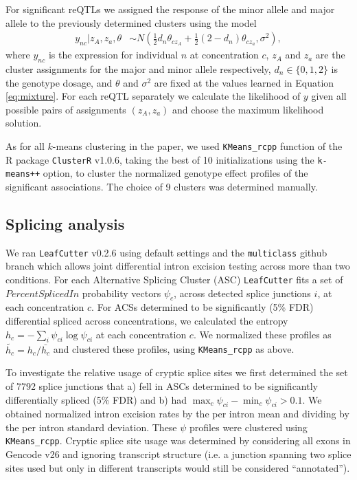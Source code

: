 \documentclass{article}
\begin{document}
{For significant reQTLs we assigned the response of the minor allele and major allele to the previously determined clusters using the model
\begin{align*}
y_{nc} | z_A,z_a, \theta &\sim N\left( \frac12 d_n \theta_{cz_A} + \frac12 (2 - d_n) \theta_{cz_a}, \sigma^2 \right),
\end{align*}
where $y_{nc}$ is the expression for individual $n$ at concentration $c$, $z_A$ and $z_a$ are the cluster assignments for the major and minor allele respectively, $d_n \in \{0,1,2\}$ is the genotype dosage, and $\theta$ and $\sigma^2$ are fixed at the values learned in Equation \ref{eq:mixture}. For each reQTL separately we calculate the likelihood of $y$ given all possible pairs of assignments $(z_A,z_a)$ and choose the maximum likelihood solution. 

As for all $k$-means clustering in the paper, we used \texttt{KMeans\_rcpp} function of the R package \texttt{ClusterR} v1.0.6, taking the best of 10 initializations using the \texttt{k-means++} option, to cluster the normalized genotype effect profiles of the significant associations. The choice of 9 clusters was determined manually. 

\subsection*{Splicing analysis}

We ran \texttt{LeafCutter} v0.2.6 using default settings and the \texttt{multiclass} github branch which allows joint differential intron excision testing across more than two conditions. For each Alternative Splicing Cluster (ASC) \texttt{LeafCutter} fits a set of $Percent Spliced In$ probability vectors $\psi_{c}$, across detected splice junctions $i$, at each concentration $c$. For ACSs determined to be significantly (5\% FDR) differential spliced across concentrations, we calculated the entropy $h_c = -\sum_i \psi_{ci} \log \psi_{ci}$ at each concentration $c$. We normalized these profiles as $\tilde{h_c} = h_c / \bar{h_c}$ and clustered these profiles, using \texttt{KMeans\_rcpp} as above. 

To investigate the relative usage of cryptic splice sites we first determined the set of 7792 splice junctions that a) fell in ASCs determined to be significantly differentially spliced (5\% FDR) and b) had $\max_c \psi_{ci} - \min_c \psi_{ci} > 0.1$. We obtained normalized intron excision rates by the per intron mean and dividing by the per intron standard deviation. These $\psi$ profiles were clustered using \texttt{KMeans\_rcpp}. Cryptic splice site usage was determined by considering all exons in Gencode v26 and ignoring transcript structure (i.e. a junction spanning two splice sites used but only in different transcripts would still be considered ``annotated''). 

}
\end{document}
